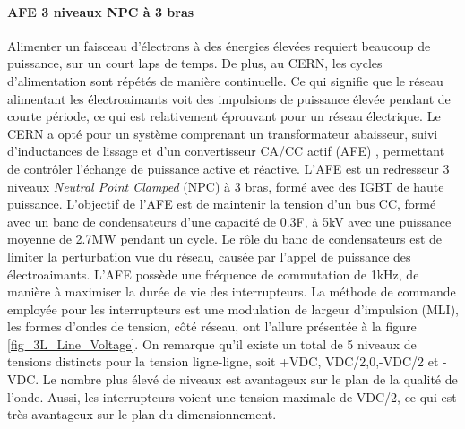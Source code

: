 \paragraph{AFE 3 niveaux NPC à 3 bras}Alimenter un faisceau d'électrons à des énergies élevées requiert beaucoup de puissance, sur un court laps de temps. De plus, au CERN, les cycles d'alimentation sont répétés de manière continuelle. Ce qui signifie que le réseau alimentant les électroaimants voit des impulsions de puissance élevée pendant de courte période, ce qui est relativement éprouvant pour un réseau électrique. Le CERN a opté pour un système comprenant un transformateur abaisseur, suivi d'inductances de lissage et d'un  convertisseur CA/CC actif (AFE) , permettant de contrôler l'échange de puissance active et réactive. L'AFE est un redresseur 3 niveaux \textit{Neutral Point Clamped} (NPC) à 3 bras, formé avec des IGBT de haute puissance. L'objectif de l'AFE est de maintenir la tension d'un bus CC, formé avec un banc de condensateurs d'une capacité de 0.3F, à 5kV avec une puissance moyenne de 2.7MW pendant un cycle. Le rôle du banc de condensateurs est de limiter la perturbation vue du réseau, causée par l'appel de puissance des électroaimants. L'AFE possède une fréquence de commutation de 1kHz, de manière à maximiser la durée de vie des interrupteurs. La méthode de commande employée pour les interrupteurs est une modulation de largeur d'impulsion (MLI), les formes d'ondes de tension, côté réseau, ont l'allure présentée à la figure \ref{fig_3L_Line_Voltage}. On remarque qu'il existe un total de 5 niveaux de tensions distincts pour la tension ligne-ligne, soit +VDC, VDC/2,0,-VDC/2 et -VDC. Le nombre plus élevé de niveaux est avantageux sur le plan de la qualité de l'onde. Aussi, les interrupteurs voient une tension maximale de VDC/2, ce qui est très avantageux sur le plan du dimensionnement.
